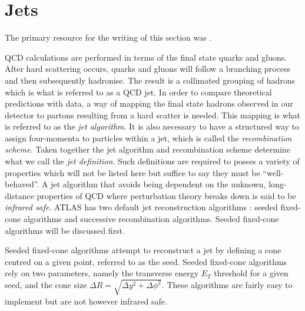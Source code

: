 \section{Jets}
The primary resource for the writing of this section was \cite{ryan}.

QCD calculations are performed in terms of the final state quarks and gluons. After hard scattering occurs, quarks and gluons will follow a branching process and then subsequently hadronise. The result is a collimated grouping of hadrons which is what is referred to as a QCD jet. In order to compare theoretical predictions with data, a way of mapping the  final state hadrons observed in our detector to partons resulting from a hard scatter is needed. This mapping is what is referred to as the \emph{jet algorithm}. It is also necessary to have a structured way to assign four-momenta to particles within a jet, which is called the \emph{recombination scheme}. Taken together the jet algorithm and recombination scheme determine what we call the \emph{jet definition}. Such definitions are required to posses a variety of properties which will not be listed here but suffice to say they must be ``well-behaved''. A jet algorithm that avoids being dependent on the unknown, long-distance properties of QCD where perturbation theory breaks down is said to be \emph{infrared safe}. ATLAS has two default jet reconstruction algorithms \cite{ATLAS}: seeded fixed-cone algorithms and successive recombination algorithms. Seeded fixed-cone algorithms will be discussed first.

Seeded fixed-cone algorithms attempt to reconstruct a jet by defining a cone centred on a given point, referred to as the seed. Seeded fixed-cone algorithms rely on two parameters, namely the transverse energy $E_{T}$  threshold for a given seed, and the cone size $\Delta R = \sqrt{\Delta y ^{2} + \Delta \phi ^{2}}$. These algorithms are fairly easy to implement but are not however infrared safe.

